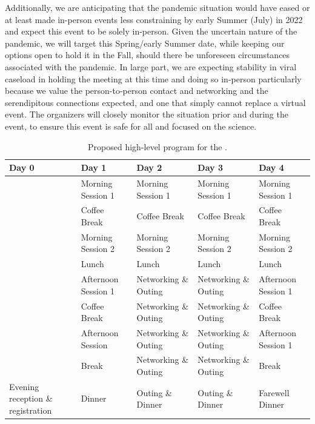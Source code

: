 Additionally, we are anticipating that the pandemic situation would
have eased or at least made in-person events less constraining by
early Summer (July) in 2022 and expect this event to be solely
in-person. Given the uncertain nature of the pandemic, we will target
this Spring/early Summer date, while keeping our options open to hold
it in the Fall, should there be unforeseen circumstances associated
with the pandemic. In large part, we are expecting stability in viral
caseload in holding the meeting at this time and doing so in-person
particularly because we value the person-to-person contact and
networking and the serendipitous connections expected, and one that
simply cannot replace a virtual event. The organizers will closely
monitor the situation prior and during the event, to ensure this event
is safe for all and focused on the science.

\begin{table}[!b]
  \centering
  \begin{tabular}{|p{2.5cm}|p{2.5cm}|p{2.5cm}|p{2.5cm}|p{2.5cm}|}
    \hline 
    \rowcolor{Gray}
    \bfseries Day 0& \bfseries Day 1&\bfseries Day 2 &\bfseries Day 3 &\bfseries Day 4\\
    \hline
                   &Morning Session 1&Morning Session 1&Morning Session 1&Morning Session 1\\
    \hline
                   &Coffee Break&Coffee Break&Coffee Break&Coffee Break\\
    \hline    
                   &Morning Session 2&Morning Session 2&Morning Session 2&Morning Session 2\\
    \hline
                   &Lunch&Lunch&Lunch&Lunch\\
    \hline
                   &Afternoon Session 1&Networking \& Outing&Networking \& Outing&Afternoon Session 1\\
    \hline
                   &Coffee Break&Networking \& Outing&Networking \& Outing&Coffee Break\\
    \hline
                   &Afternoon Session &Networking \& Outing&Networking \& Outing&Afternoon Session 1\\
    \hline
                   &Break&Networking \& Outing&Networking \& Outing&Break\\
    \hline
    Evening reception \& registration&Dinner&Outing \& Dinner&Outing \&
                                                               Dinner&Farewell Dinner\\
    \hline        
  \end{tabular}
  \caption{Proposed high-level program for the \sympe.}
  \label{tab:symp}
\end{table}

